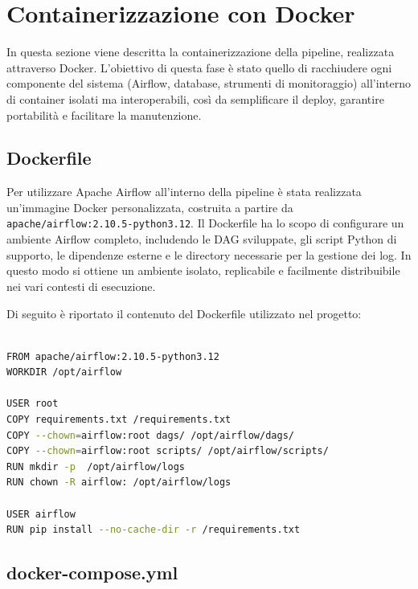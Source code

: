 \section{Containerizzazione con Docker}
\label{sec:impldocker}

In questa sezione viene descritta la containerizzazione della pipeline, realizzata attraverso Docker.
L’obiettivo di questa fase è stato quello di racchiudere ogni componente del sistema (Airflow, database, strumenti di monitoraggio) all’interno di container isolati ma interoperabili, 
così da semplificare il deploy, garantire portabilità e facilitare la manutenzione. 

\subsection{Dockerfile}
\label{subsec:impldockerfile}

Per utilizzare Apache Airflow all’interno della pipeline è stata realizzata un’immagine Docker personalizzata, costruita a partire da \texttt{apache/airflow:2.10.5-python3.12}.  
Il Dockerfile ha lo scopo di configurare un ambiente Airflow completo, includendo le DAG sviluppate, gli script Python di supporto, le dipendenze esterne e le directory necessarie per la gestione dei log.  
In questo modo si ottiene un ambiente isolato, replicabile e facilmente distribuibile nei vari contesti di esecuzione.

Di seguito è riportato il contenuto del Dockerfile utilizzato nel progetto:

\newpage

\begin{lstlisting}[language=bash, caption={Dockerfile per la creazione dell'immagine personalizzata di Airflow}, label={lst:dockerfile}, basicstyle=\scriptsize\ttfamily]

FROM apache/airflow:2.10.5-python3.12 
WORKDIR /opt/airflow

USER root
COPY requirements.txt /requirements.txt
COPY --chown=airflow:root dags/ /opt/airflow/dags/
COPY --chown=airflow:root scripts/ /opt/airflow/scripts/
RUN mkdir -p  /opt/airflow/logs 
RUN chown -R airflow: /opt/airflow/logs

USER airflow
RUN pip install --no-cache-dir -r /requirements.txt
\end{lstlisting}

\subsection{docker-compose.yml}
\label{subsec:impldocker_compose}

